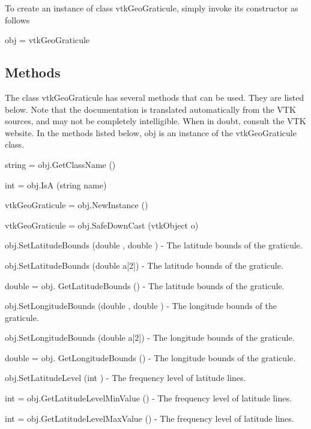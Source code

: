 To create an instance of class vtk\-Geo\-Graticule, simply invoke its constructor as follows \begin{DoxyVerb}  obj = vtkGeoGraticule
\end{DoxyVerb}
 \hypertarget{vtkwidgets_vtkxyplotwidget_Methods}{}\subsection{Methods}\label{vtkwidgets_vtkxyplotwidget_Methods}
The class vtk\-Geo\-Graticule has several methods that can be used. They are listed below. Note that the documentation is translated automatically from the V\-T\-K sources, and may not be completely intelligible. When in doubt, consult the V\-T\-K website. In the methods listed below, {\ttfamily obj} is an instance of the vtk\-Geo\-Graticule class. 
\begin{DoxyItemize}
\item {\ttfamily string = obj.\-Get\-Class\-Name ()}  
\item {\ttfamily int = obj.\-Is\-A (string name)}  
\item {\ttfamily vtk\-Geo\-Graticule = obj.\-New\-Instance ()}  
\item {\ttfamily vtk\-Geo\-Graticule = obj.\-Safe\-Down\-Cast (vtk\-Object o)}  
\item {\ttfamily obj.\-Set\-Latitude\-Bounds (double , double )} -\/ The latitude bounds of the graticule.  
\item {\ttfamily obj.\-Set\-Latitude\-Bounds (double a\mbox{[}2\mbox{]})} -\/ The latitude bounds of the graticule.  
\item {\ttfamily double = obj. Get\-Latitude\-Bounds ()} -\/ The latitude bounds of the graticule.  
\item {\ttfamily obj.\-Set\-Longitude\-Bounds (double , double )} -\/ The longitude bounds of the graticule.  
\item {\ttfamily obj.\-Set\-Longitude\-Bounds (double a\mbox{[}2\mbox{]})} -\/ The longitude bounds of the graticule.  
\item {\ttfamily double = obj. Get\-Longitude\-Bounds ()} -\/ The longitude bounds of the graticule.  
\item {\ttfamily obj.\-Set\-Latitude\-Level (int )} -\/ The frequency level of latitude lines.  
\item {\ttfamily int = obj.\-Get\-Latitude\-Level\-Min\-Value ()} -\/ The frequency level of latitude lines.  
\item {\ttfamily int = obj.\-Get\-Latitude\-Level\-Max\-Value ()} -\/ The frequency level of latitude lines.  

\end{DoxyItemize}
